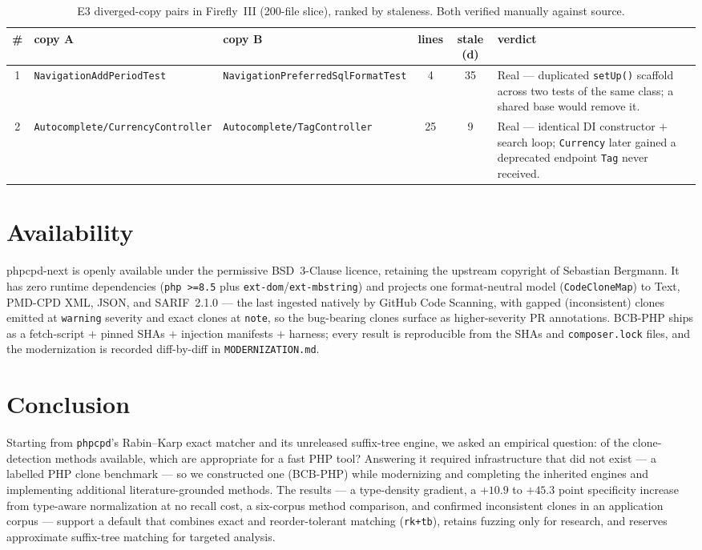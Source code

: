 \documentclass[10pt,a4paper]{article}
\newcounter{prop}[section]
\newcounter{lem}[section]
\begin{document}
\begin{table}[h]
\centering
\caption{E3 diverged-copy pairs in Firefly~III (200-file slice), ranked by staleness. Both verified
manually against source.}
\label{tab:e3}
\footnotesize
\begin{tabular}{@{}c p{2.6cm} p{2.6cm} c c p{4.0cm}@{}}
\toprule
\textbf{\#} & \textbf{copy A} & \textbf{copy B} & \textbf{lines} & \textbf{stale (d)} & \textbf{verdict} \\
\midrule
1 & \texttt{Navigation\-AddPeriodTest} & \texttt{Navigation\-PreferredSql\-FormatTest} & 4 & 35 &
Real --- duplicated \lstinline!setUp()! scaffold across two tests of the same class; a shared base
would remove it. \\
2 & \texttt{Autocomplete/\-CurrencyController} & \texttt{Autocomplete/\-TagController} & 25 & 9 &
Real --- identical DI constructor $+$ search loop; \texttt{Currency} later gained a deprecated
endpoint \texttt{Tag} never received. \\
\bottomrule
\end{tabular}
\end{table}

\section{Availability}
phpcpd-next is openly available under the permissive BSD~3-Clause licence, retaining the upstream
copyright of Sebastian Bergmann. It has zero runtime dependencies (\texttt{php >=8.5} plus
\texttt{ext-dom}/\texttt{ext-mbstring}) and projects one format-neutral model
(\lstinline!CodeCloneMap!) to Text, PMD-CPD XML, JSON, and SARIF~2.1.0 --- the last ingested natively
by GitHub Code Scanning, with gapped (inconsistent) clones emitted at \texttt{warning} severity and
exact clones at \texttt{note}, so the bug-bearing clones surface as higher-severity PR annotations.
BCB-PHP ships as a fetch-script $+$ pinned SHAs $+$ injection manifests $+$ harness; every result is
reproducible from the SHAs and \texttt{composer.lock} files, and the modernization is recorded
diff-by-diff in \texttt{MODERNIZATION.md}.

\section{Conclusion}
Starting from \texttt{phpcpd}'s Rabin--Karp exact matcher and its unreleased suffix-tree engine, we
asked an empirical question: of the clone-detection methods available, which are appropriate for a fast
PHP tool? Answering it required infrastructure that did not exist --- a labelled PHP clone benchmark ---
so we constructed one (BCB-PHP) while modernizing and completing the inherited engines and implementing
additional literature-grounded methods. The results --- a type-density gradient, a $+10.9$ to $+45.3$
point specificity increase from type-aware normalization at no recall cost, a six-corpus method
comparison, and confirmed inconsistent clones in an application corpus --- support a default that
combines exact and reorder-tolerant matching (\texttt{rk+tb}), retains fuzzing only for research, and
reserves approximate suffix-tree matching for targeted analysis.
\end{document}
